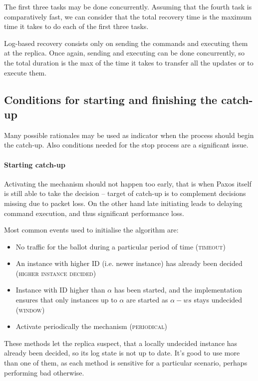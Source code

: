 The first three tasks may be done concurrently. Assuming that the fourth task is comparatively fast, we can consider that the total recovery time is the maximum time it takes to do each of the first three tasks.


Log-based recovery consists only on sending the commands and executing them at the replica. Once again, sending and executing can be done concurrently, so the total duration is the max of the time it takes to transfer all the updates or to execute them.

\subsection{Conditions for starting and finishing the catch-up}
\label{subsec:conditions_for_starting_and_finishing_the_catch_up}
Many possible rationales may be used as indicator when the process should begin the catch-up. Also conditions needed for the stop process are a significant issue.

\paragraph*{Starting catch-up}
Activating the mechanism should not happen too early, that is when Paxos itself is still able to take the decision -- target of catch-up is to complement decisions missing due to packet loss. On the other hand late initiating leads to delaying command execution, and thus significant performance loss.

Most common events used to initialise the algorithm are:
\begin{itemize}
  \item No traffic for the ballot during a particular period of time (\textsc{timeout})
  \item An instance with higher ID (i.e. newer instance) has already been decided \\ (\textsc{higher instance decided})
  \item Instance with ID higher than $\alpha$ has been started, and the implementation ensures that only instances up to $\alpha$ are started as $\alpha-ws$ stays undecided (\textsc{window})
  \item Activate periodically the mechanism (\textsc{periodical})
\end{itemize}

These methods let the replica suspect, that a locally undecided instance has already been decided, so its log state is not up to date. It's good to use more than one of them, as each method is sensitive for a particular scenario, perhaps performing bad otherwise.

